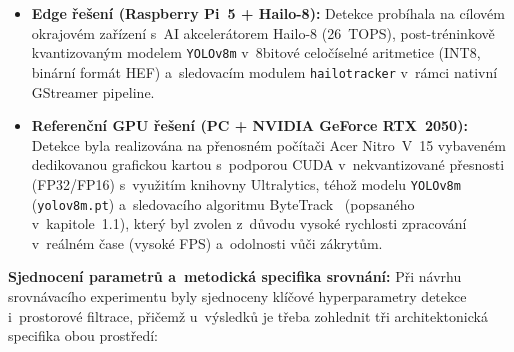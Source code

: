\begin{itemize}
    \item \textbf{Edge řešení (Raspberry Pi~5 + Hailo-8):} Detekce probíhala na cílovém okrajovém zařízení s~AI akcelerátorem Hailo-8 (26~\acs{TOPS}), post-tréninkově kvantizovaným modelem \texttt{YOLOv8m} v~8bitové celočíselné aritmetice (INT8, binární formát \acs{HEF}) a~sledovacím modulem \texttt{hailotracker} v~rámci nativní GStreamer pipeline.
    \item \textbf{Referenční \acs{GPU} řešení (PC + NVIDIA GeForce RTX~2050):} Detekce byla realizována na přenosném počítači Acer Nitro~V~15 vybaveném dedikovanou grafickou kartou s~podporou CUDA v~nekvantizované přesnosti (FP32/FP16) s~využitím knihovny Ultralytics, téhož modelu \texttt{YOLOv8m} (\texttt{yolov8m.pt}) a~sledovacího algoritmu ByteTrack~\cite{zhang_bytetrack_2022} (popsaného v~kapitole~1.1), který byl zvolen z~důvodu vysoké rychlosti zpracování v~reálném čase (vysoké \acs{FPS}) a~odolnosti vůči zákrytům.
\end{itemize}

\textbf{Sjednocení parametrů a~metodická specifika srovnání:} Při návrhu srovnávacího experimentu byly sjednoceny klíčové hyperparametry detekce i~prostorové filtrace, přičemž u~výsledků je třeba zohlednit tři architektonická specifika obou prostředí:

